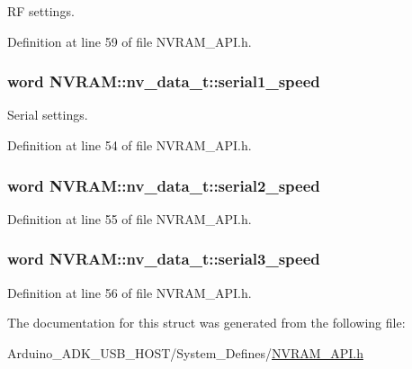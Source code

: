 R\-F settings. 



Definition at line 59 of file N\-V\-R\-A\-M\-\_\-\-A\-P\-I.\-h.

\hypertarget{struct_n_v_r_a_m_1_1nv__data__t_abb123c8c889c02ac4029546337aa9fe2}{
\subsubsection[{serial1\-\_\-speed}]{\setlength{\rightskip}{0pt plus 5cm}word N\-V\-R\-A\-M\-::nv\-\_\-data\-\_\-t\-::serial1\-\_\-speed}}\label{struct_n_v_r_a_m_1_1nv__data__t_abb123c8c889c02ac4029546337aa9fe2}


Serial settings. 



Definition at line 54 of file N\-V\-R\-A\-M\-\_\-\-A\-P\-I.\-h.

\hypertarget{struct_n_v_r_a_m_1_1nv__data__t_a3be4f4188f49b382494b2992eb431101}{
\subsubsection[{serial2\-\_\-speed}]{\setlength{\rightskip}{0pt plus 5cm}word N\-V\-R\-A\-M\-::nv\-\_\-data\-\_\-t\-::serial2\-\_\-speed}}\label{struct_n_v_r_a_m_1_1nv__data__t_a3be4f4188f49b382494b2992eb431101}


Definition at line 55 of file N\-V\-R\-A\-M\-\_\-\-A\-P\-I.\-h.

\hypertarget{struct_n_v_r_a_m_1_1nv__data__t_acd7027d3c02c1699cf6df2b9a5277414}{
\subsubsection[{serial3\-\_\-speed}]{\setlength{\rightskip}{0pt plus 5cm}word N\-V\-R\-A\-M\-::nv\-\_\-data\-\_\-t\-::serial3\-\_\-speed}}\label{struct_n_v_r_a_m_1_1nv__data__t_acd7027d3c02c1699cf6df2b9a5277414}


Definition at line 56 of file N\-V\-R\-A\-M\-\_\-\-A\-P\-I.\-h.



The documentation for this struct was generated from the following file\-:\begin{DoxyCompactItemize}
\item 
Arduino\-\_\-\-A\-D\-K\-\_\-\-U\-S\-B\-\_\-\-H\-O\-S\-T/\-System\-\_\-\-Defines/\hyperlink{_n_v_r_a_m___a_p_i_8h}{N\-V\-R\-A\-M\-\_\-\-A\-P\-I.\-h}\end{DoxyCompactItemize}
